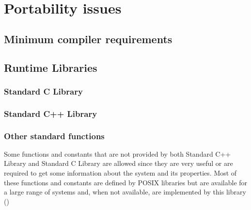 \chapter{Portability issues}
\label{cha:port}

\section{Minimum compiler requirements}

\section{Runtime Libraries}

\subsection{Standard C Library}

\subsection{Standard C++ Library}

\subsection{Other standard functions}

Some functions and constants that are not provided by both Standard C++ Library and Standard C Library are allowed since they are very useful or are required to get some information about the system and its properties.
Most of these functions and constants are defined by POSIX libraries but are available for a large range of systems and, when not available, are implemented by this library ()

